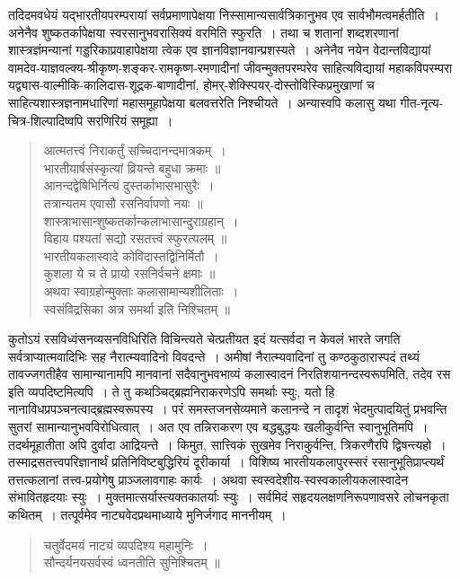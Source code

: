 {\dev तदिदमवधेयं यद्भारतीयपरम्परायां सर्वप्रमाणापेक्षया निस्सामान्यसार्वत्रिकानुभव एव सार्व\-भौमत्वमर्हतीति~। अनेनैव शुष्कतर्कापेक्षया स्वरसानुभवरासिक्यं वरमिति स्फुरति~। तथा च शतानां शब्दशरणानां शास्त्रज्ञंमन्यानां गड्डरिकाप्रवाहापेक्षया त्वेक एव ज्ञानविज्ञानवान्प्रश\-स्यते~। अनेनैव नयेन वेदान्तविद्यायां  वामदेव-याज्ञवल्क्य-श्रीकृष्ण-शङ्कर-रामकृष्ण-रमणा\-दीनां जीवन्मुक्तपरम्परेव साहित्यविद्यायां महाकविपरम्परा यद्व्यास-वाल्मीकि-कालिदास-शूद्रक-बाणादीनां, होमर्-शेक्स्पियर्-दोस्तोविस्किप्रमुखाणां च साहित्यशास्त्रज्ञनामधारिणां महासमूहापेक्षया बलवत्तरेति निश्चीयते~। अन्यास्वपि कलासु यथा गीत-नृत्य-चित्र-शिल्पादिष्वपि सरणिरियं समूह्या~।}
\begin{quote}
{\dev आत्मतत्त्वं निराकर्तुं सच्चिदानन्दमात्रकम्~।}\\
{\dev भारतीयार्षसंस्कृत्यां व्रियन्ते बहुधा क्रमाः ॥}\\[5pt]
{\dev आनन्दद्वेषिभिर्नित्यं दुस्तर्काभासभासुरैः~।}\\
{\dev तत्रान्यतम एवासौ रसनिर्वापणो नयः ॥}\\[5pt]
{\dev शास्त्राभासान्शुष्कतर्कान्कलाभासान्दुराग्रहान्~।}\\
{\dev विहाय पश्यतां सद्यो रसतत्त्वं स्फुरत्यलम् ॥}\\[5pt]
{\dev भारतीयकलास्वादे कोविदास्तद्विनिर्मितौ~।}\\
{\dev कुशला ये च ते प्रायो रसनिर्वचने क्षमाः ॥}\\[5pt]
{\dev अथवा स्वाग्रहोन्मुक्ताः कलासामान्यशीलिताः~।}\\
{\dev स्वसंविद्रसिका अत्र समर्था इति निश्चितम् ॥}
\end{quote}

{\dev कुतोऽयं रसविध्वंसनव्यसनविधिरिति विचिन्त्यते चेत्प्रतीयत इदं यत्सर्वदा न केवलं भारते जगति सर्वत्राप्यात्मवादिभिः सह नैरात्म्यवादिनो विवदन्ते~। अमीषां नैरात्म्यवादिनां तु कण्ठ\-कुठारास्पदं तथ्यं तावज्जगतीहैव सामान्यानामपि मानवानां सदैवानुभवभाव्यं कला\-स्वादनं निरतिशयानन्दस्वरूपमिति, तदेव रस इति व्यपदिष्टमित्यपि~। ते तु कथञ्चिद्ब्रह्मनिरा\-करणेऽपि समर्थाः स्युः, यतो हि नानाविधप्रपञ्चनत्वाद्ब्रह्मस्वरूपस्य~। परं समस्तजनसेव्यमाने कलानन्दे न तादृशं भेदमुत्पादयितुं प्रभवन्ति सुतरां सामान्यानुभवविरोधित्वात्~। अत एव तन्निराकरण एव बद्धबुद्धयः खलीकुर्वन्ति स्वानुभूतिमपि~। तदर्थमूहातीता अपि दुर्वादा आद्रियन्ते~। किमुत, सात्त्विकं सुखमेव निराकुर्वन्ति, त्रिकरणैरपि द्विषन्त्यहो~। तस्माद्रसतत्त्वपरिज्ञानार्थं  प्रतिनिविष्टबुद्धिरियं दूरीकार्या~। विशिष्य भारतीयकलापुरस्सरं रसानुभूतिप्राप्त्यर्थं तत्तत्कलानां तत्त्व-प्रयोगेषु प्राञ्जलावगाहः कार्यः~। अथवा स्वस्वदेशीय-स्वस्वकालीयकलास्वादेन संभा\-वितहृदयाः स्युः~। मुक्तमात्सर्यास्त्यक्तकातर्याः स्युः~। सर्वमिदं सहृदयलक्षणनिरूपणावसरे लोचनकृता कथितम्~। तत्पूर्वमेव नाट्यवेदप्रथमाध्याये मुनिर्जगाद माननीयम्~।}   
\begin{quote}
{\dev चतुर्वेदमयं नाट्यं व्यपदिश्य महामुनिः~।}\\
{\dev सौन्दर्यनयसर्वस्वं ध्वनतीति सुनिश्चितम् ॥}
\end{quote}


